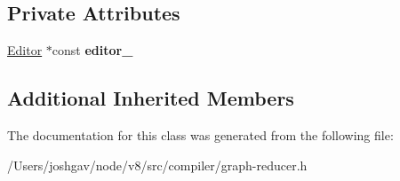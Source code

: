 \subsection*{Private Attributes}
\begin{DoxyCompactItemize}
\item 
\hyperlink{classv8_1_1internal_1_1compiler_1_1_advanced_reducer_1_1_editor}{Editor} $\ast$const {\bfseries editor\+\_\+}\hypertarget{classv8_1_1internal_1_1compiler_1_1_advanced_reducer_ac6d09f2e5a2a0e06be0b38642e69efdb}{}\label{classv8_1_1internal_1_1compiler_1_1_advanced_reducer_ac6d09f2e5a2a0e06be0b38642e69efdb}

\end{DoxyCompactItemize}
\subsection*{Additional Inherited Members}


The documentation for this class was generated from the following file\+:\begin{DoxyCompactItemize}
\item 
/\+Users/joshgav/node/v8/src/compiler/graph-\/reducer.\+h\end{DoxyCompactItemize}
